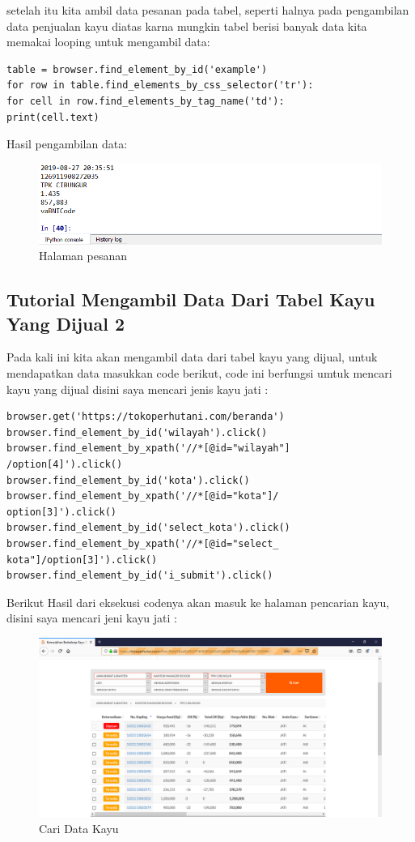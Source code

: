 setelah itu kita ambil data pesanan pada tabel, seperti halnya pada pengambilan data penjualan kayu diatas karna mungkin tabel berisi banyak data kita memakai looping untuk mengambil data:
\begin{verbatim}
table = browser.find_element_by_id('example')
for row in table.find_elements_by_css_selector('tr'):
for cell in row.find_elements_by_tag_name('td'):
print(cell.text)
\end{verbatim}
\newpage
Hasil pengambilan data:
\begin{figure}[h]
	\centering
	\includegraphics[scale=0.55]{figures/8datapesan}
	\caption{Halaman pesanan}
\end{figure}


\newpage
\subsection{Tutorial Mengambil Data Dari Tabel Kayu Yang Dijual 2}
Pada kali ini kita akan mengambil data dari tabel kayu yang dijual, untuk mendapatkan data masukkan code berikut, code ini berfungsi umtuk mencari kayu yang dijual disini saya mencari jenis kayu jati :
\begin{verbatim}
browser.get('https://tokoperhutani.com/beranda')
browser.find_element_by_id('wilayah').click()
browser.find_element_by_xpath('//*[@id="wilayah"]
/option[4]').click()
browser.find_element_by_id('kota').click()
browser.find_element_by_xpath('//*[@id="kota"]/
option[3]').click()
browser.find_element_by_id('select_kota').click()
browser.find_element_by_xpath('//*[@id="select_
kota"]/option[3]').click()
browser.find_element_by_id('i_submit').click()
\end{verbatim}
Berikut Hasil dari eksekusi codenya akan masuk ke halaman pencarian kayu, disini saya mencari jeni kayu jati  :
\begin{figure}[h]
	\centering
	\includegraphics[scale=0.3]{figures/caridatakayu}
	\caption{Cari Data Kayu}
\end{figure}

